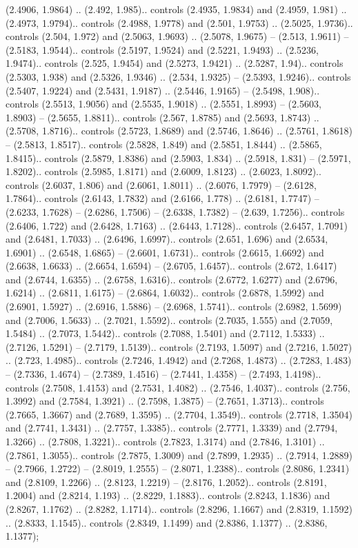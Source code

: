 (2.4906, 1.9864) .. (2.492, 1.985).. controls (2.4935, 1.9834) and (2.4959, 1.981) .. (2.4973, 1.9794).. controls (2.4988, 1.9778) and (2.501, 1.9753) .. (2.5025, 1.9736).. controls (2.504, 1.972) and (2.5063, 1.9693) .. (2.5078, 1.9675) -- (2.513, 1.9611) -- (2.5183, 1.9544).. controls (2.5197, 1.9524) and (2.5221, 1.9493) .. (2.5236, 1.9474).. controls (2.525, 1.9454) and (2.5273, 1.9421) .. (2.5287, 1.94).. controls (2.5303, 1.938) and (2.5326, 1.9346) .. (2.534, 1.9325) -- (2.5393, 1.9246).. controls (2.5407, 1.9224) and (2.5431, 1.9187) .. (2.5446, 1.9165) -- (2.5498, 1.908).. controls (2.5513, 1.9056) and (2.5535, 1.9018) .. (2.5551, 1.8993) -- (2.5603, 1.8903) -- (2.5655, 1.8811).. controls (2.567, 1.8785) and (2.5693, 1.8743) .. (2.5708, 1.8716).. controls (2.5723, 1.8689) and (2.5746, 1.8646) .. (2.5761, 1.8618) -- (2.5813, 1.8517).. controls (2.5828, 1.849) and (2.5851, 1.8444) .. (2.5865, 1.8415).. controls (2.5879, 1.8386) and (2.5903, 1.834) .. (2.5918, 1.831) -- (2.5971, 1.8202).. controls (2.5985, 1.8171) and (2.6009, 1.8123) .. (2.6023, 1.8092).. controls (2.6037, 1.806) and (2.6061, 1.8011) .. (2.6076, 1.7979) -- (2.6128, 1.7864).. controls (2.6143, 1.7832) and (2.6166, 1.778) .. (2.6181, 1.7747) -- (2.6233, 1.7628) -- (2.6286, 1.7506) -- (2.6338, 1.7382) -- (2.639, 1.7256).. controls (2.6406, 1.722) and (2.6428, 1.7163) .. (2.6443, 1.7128).. controls (2.6457, 1.7091) and (2.6481, 1.7033) .. (2.6496, 1.6997).. controls (2.651, 1.696) and (2.6534, 1.6901) .. (2.6548, 1.6865) -- (2.6601, 1.6731).. controls (2.6615, 1.6692) and (2.6638, 1.6633) .. (2.6654, 1.6594) -- (2.6705, 1.6457).. controls (2.672, 1.6417) and (2.6744, 1.6355) .. (2.6758, 1.6316).. controls (2.6772, 1.6277) and (2.6796, 1.6214) .. (2.6811, 1.6175) -- (2.6864, 1.6032).. controls (2.6878, 1.5992) and (2.6901, 1.5927) .. (2.6916, 1.5886) -- (2.6968, 1.5741).. controls (2.6982, 1.5699) and (2.7006, 1.5633) .. (2.7021, 1.5592).. controls (2.7035, 1.555) and (2.7059, 1.5484) .. (2.7073, 1.5442).. controls (2.7088, 1.5401) and (2.7112, 1.5333) .. (2.7126, 1.5291) -- (2.7179, 1.5139).. controls (2.7193, 1.5097) and (2.7216, 1.5027) .. (2.723, 1.4985).. controls (2.7246, 1.4942) and (2.7268, 1.4873) .. (2.7283, 1.483) -- (2.7336, 1.4674) -- (2.7389, 1.4516) -- (2.7441, 1.4358) -- (2.7493, 1.4198).. controls (2.7508, 1.4153) and (2.7531, 1.4082) .. (2.7546, 1.4037).. controls (2.756, 1.3992) and (2.7584, 1.3921) .. (2.7598, 1.3875) -- (2.7651, 1.3713).. controls (2.7665, 1.3667) and (2.7689, 1.3595) .. (2.7704, 1.3549).. controls (2.7718, 1.3504) and (2.7741, 1.3431) .. (2.7757, 1.3385).. controls (2.7771, 1.3339) and (2.7794, 1.3266) .. (2.7808, 1.3221).. controls (2.7823, 1.3174) and (2.7846, 1.3101) .. (2.7861, 1.3055).. controls (2.7875, 1.3009) and (2.7899, 1.2935) .. (2.7914, 1.2889) -- (2.7966, 1.2722) -- (2.8019, 1.2555) -- (2.8071, 1.2388).. controls (2.8086, 1.2341) and (2.8109, 1.2266) .. (2.8123, 1.2219) -- (2.8176, 1.2052).. controls (2.8191, 1.2004) and (2.8214, 1.193) .. (2.8229, 1.1883).. controls (2.8243, 1.1836) and (2.8267, 1.1762) .. (2.8282, 1.1714).. controls (2.8296, 1.1667) and (2.8319, 1.1592) .. (2.8333, 1.1545).. controls (2.8349, 1.1499) and (2.8386, 1.1377) .. (2.8386, 1.1377);




